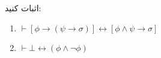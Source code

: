 اثبات کنید:
\begin{enumerate}[label=(\alph*)]
    \item $\vdash [\phi\to(\psi\to\sigma)]\leftrightarrow[\phi\wedge\psi\to\sigma]$
    \item $\vdash\bot\leftrightarrow(\phi\wedge\neg\phi)$
\end{enumerate}